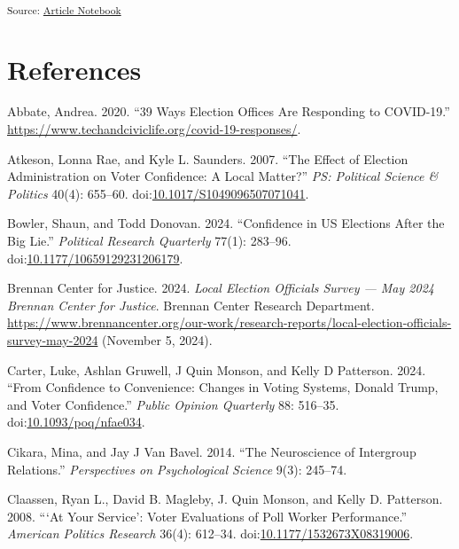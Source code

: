 \documentclass[
  11pt,
  a4paper,
]{scrartcl}
\newlength{\cslhangindent}
\newenvironment{CSLReferences}[2] %
 {\begin{list}{}{%
  \setlength{\itemindent}{0pt}
  \setlength{\leftmargin}{0pt}
  \setlength{\parsep}{0pt}
  \ifodd #1
   \setlength{\leftmargin}{\cslhangindent}
   \setlength{\itemindent}{-1\cslhangindent}
  \fi
  \setlength{\itemsep}{#2\baselineskip}}}
 {\end{list}}
\begin{document}
\textsubscript{Source:
\href{https://isaiahespi.github.io/rea-paper/index.qmd.html}{Article
Notebook}}

\pagebreak

\section*{References}\label{bibliography}

\label{refs}
\begin{CSLReferences}{1}{1}
Abbate, Andrea. 2020. {``39 {Ways Election Offices} Are {Responding} to
{COVID-19}.''}
\url{https://www.techandciviclife.org/covid-19-responses/}.

Atkeson, Lonna Rae, and Kyle L. Saunders. 2007. {``The {Effect} of
{Election Administration} on {Voter Confidence}: {A Local Matter}?''}
\emph{PS: Political Science \& Politics} 40(4): 655--60.
doi:\href{https://doi.org/10.1017/S1049096507071041}{10.1017/S1049096507071041}.

Bowler, Shaun, and Todd Donovan. 2024. {``Confidence in {US Elections
After} the {Big Lie}.''} \emph{Political Research Quarterly} 77(1):
283--96.
doi:\href{https://doi.org/10.1177/10659129231206179}{10.1177/10659129231206179}.

Brennan Center for Justice. 2024. \emph{Local {Election Officials
Survey} --- {May} 2024 \textbar{} {Brennan Center} for {Justice}}.
Brennan Center Research Department.
\url{https://www.brennancenter.org/our-work/research-reports/local-election-officials-survey-may-2024}
(November 5, 2024).

Carter, Luke, Ashlan Gruwell, J Quin Monson, and Kelly D Patterson.
2024. {``From {Confidence} to {Convenience}: {Changes} in {Voting
Systems}, {Donald Trump}, and {Voter Confidence}.''} \emph{Public
Opinion Quarterly} 88: 516--35.
doi:\href{https://doi.org/10.1093/poq/nfae034}{10.1093/poq/nfae034}.

Cikara, Mina, and Jay J Van Bavel. 2014. {``The {Neuroscience} of
{Intergroup Relations}.''} \emph{Perspectives on Psychological Science}
9(3): 245--74.

Claassen, Ryan L., David B. Magleby, J. Quin Monson, and Kelly D.
Patterson. 2008. {``{`{At Your Service}'}: {Voter Evaluations} of {Poll
Worker Performance}.''} \emph{American Politics Research} 36(4):
612--34.
doi:\href{https://doi.org/10.1177/1532673X08319006}{10.1177/1532673X08319006}.


\end{CSLReferences}
\end{document}
